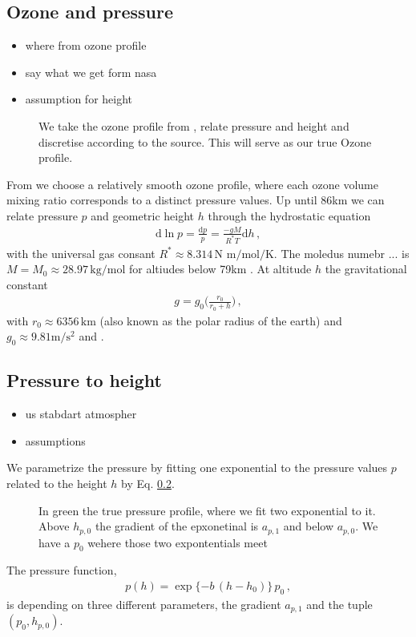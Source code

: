 \subsection{Ozone and pressure}
\begin{itemize}
	\item where from ozone profile
	\item say what we get form nasa
	\item assumption for height
\end{itemize}

\begin{figure}[ht!]
	\centering
	\caption{We take the ozone profile from \cite{}, relate pressure and height and discretise according to the source.
		This will serve as our true Ozone profile.}
	\label{fig:nter-label}
\end{figure}
From \cite{} we choose a relatively smooth ozone profile, where each ozone volume mixing ratio corresponds to a distinct pressure values.
Up until $86$km we can relate pressure $p$ and geometric height $h$ through the hydrostatic equation
\begin{align}
	\text{d} \ln p= \frac{\text{d}p}{p} = \frac{- g M}{R^* T} \text{d} h \, ,
\end{align}
with the universal gas consant $R^* \approx 8.314  \, \text{N m} / \text{mol} / \text{K}$. The moledus numebr ... is $M = M_0 \approx 28.97 \, \text{kg}/\text{mol}$ for altiudes below 79km \cite{}.
At altitude $h$ the gravitational constant
\begin{align}
	g = g_0 \Bigg( \frac{r_0}{r_0 + h} \Bigg) \, ,
\end{align}
with $r_0 \approx 6356 \, \text{km}$ (also known as the polar radius of the earth) and $g_0 \approx 9.81 \text{m}/\text{s}^2$ and \cite{}.
\subsection{Pressure to height}
\begin{itemize}
	\item us stabdart atmospher
	\item assumptions
\end{itemize}
We parametrize the pressure by fitting one exponential to the pressure values $p$ related to the height $h$ by Eq. \ref{}.
\begin{figure}[ht!]
	\centering
	\caption{In green the true pressure profile, where we fit two exponential to it.
		Above $h_{p,0}$ the gradient of the epxonetinal is $a_{p,1}$ and below $a_{p,0}$.
		We have a $p_0$ wehere those two expontentials meet}
	\label{fig:nter-label}
\end{figure}
The pressure function,
\begin{align}
	p(h) =
		\exp{ \{ -b \,  (h - h_{0} ) \} } \,  p_0 \, ,
\end{align}
is depending on three different parameters, the gradient $a_{p,1}$ and the tuple $(p_0,h_{p,0})$.


